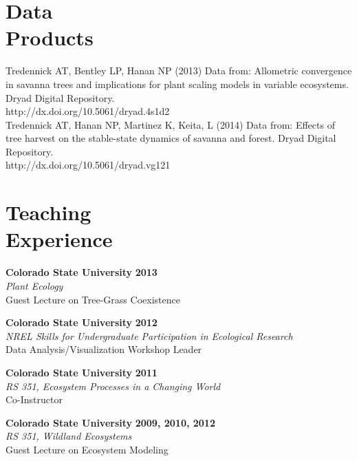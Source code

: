 \documentclass[margin,line]{resume}
\begin{document}
\begin{resume}
    \section{\mysidestyle Data\\Products}
    Tredennick AT, Bentley LP, Hanan NP (2013) Data from: Allometric convergence in savanna trees and implications for plant scaling models in variable ecosystems. Dryad Digital Repository. \\ http://dx.doi.org/10.5061/dryad.4s1d2 \vspace{-6mm}\\%
    
    Tredennick AT, Hanan NP, Martinez K, Keita, L (2014) Data from: Effects of tree harvest on the stable-state dynamics of savanna and forest. Dryad Digital Repository. \\ http://dx.doi.org/10.5061/dryad.vg121
    
    \section{\mysidestyle Teaching\\Experience}
    \textbf{Colorado State University} \hfill \textbf{2013}\\
               \textsl{Plant Ecology}\\
               Guest Lecture on Tree-Grass Coexistence
               
    \textbf{Colorado State University} \hfill \textbf{2012}\\ 
               \textsl{NREL Skills for Undergraduate Participation in Ecological Research}\\
               Data Analysis/Visualization Workshop Leader
               
    \textbf{Colorado State University} \hfill \textbf{2011}\\ 
               \textsl{RS 351, Ecosystem Processes in a Changing World}\\
               Co-Instructor 
               
    \textbf{Colorado State University} \hfill \textbf{2009, 2010, 2012}\\ 
               \textsl{RS 351, Wildland Ecosystems}\\
               Guest Lecture on Ecosystem Modeling
               

\end{resume}
\end{document}
